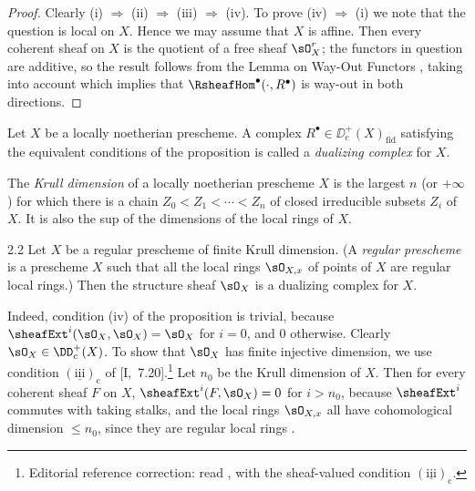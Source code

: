 \begin{proof}
Clearly (i) $\Longrightarrow$ (ii) $\Longrightarrow$ (iii) $\Longrightarrow$ (iv). To prove (iv) $\Longrightarrow$ (i) we note that the question is local on $X$. Hence we may assume that $X$ is affine. Then every coherent sheaf on $X$ is the quotient of a free sheaf $\sO_X^r$; the functors in question are additive, so the result follows from the Lemma on Way-Out Functors , taking into account  which implies that $\RsheafHom^\bullet(\cdot,R^\bullet)$ is way-out in both directions.
\end{proof}

\begin{definition*}
Let $X$ be a locally noetherian prescheme. A complex $R^\bullet\in\DD^+_{\mathrm{c}}(X)_{\mathrm{fid}}$ satisfying the equivalent conditions of the proposition is called a \emph{dualizing complex} for $X$.
\end{definition*}

\begin{definition*}
The \emph{Krull dimension} of a locally noetherian prescheme $X$ is the largest $n$ (or $+\infty$) for which there is a chain $Z_0<Z_1<\cdots<Z_n$ of closed irreducible subsets $Z_i$ of $X$. It is also the sup of the dimensions of the local rings of $X$.
\end{definition*}

\begin{bookexample}{2.2}\label{ex:5.2.2}
Let $X$ be a regular prescheme of finite Krull dimension. (A \emph{regular prescheme} is a prescheme $X$ such that all the local rings $\sO_{X,x}$ of points of $X$ are regular local rings.) Then the structure sheaf $\sO_X$ is a dualizing complex for $X$.

Indeed, condition (iv) of the proposition is trivial, because $\sheafExt^{i}(\sO_X,\sO_X)=\sO_X$ for $i=0$, and $0$ otherwise. Clearly $\sO_X\in\DD_{\mathrm{c}}^{+}(X)$. To show that $\sO_X$ has finite injective dimension, we use condition $(\underline{\mathrm{iii}})_{\mathrm{c}}$ of [I,~7.20].\footnote{Editorial reference correction: read , with the sheaf-valued condition $(\underline{\mathrm{iii}})_{\mathrm{c}}$.} Let $n_0$ be the Krull dimension of $X$. Then for every coherent sheaf $F$ on $X$, $\sheafExt^{i}(F,\sO_X)=0$ for $i>n_0$, because $\sheafExt^{i}$ commutes with taking stalks, and the local rings $\sO_{X,x}$ all have cohomological dimension $\leq n_0$, since they are regular local rings \cite[\nopp (28.2)]{14}.
\end{bookexample}


